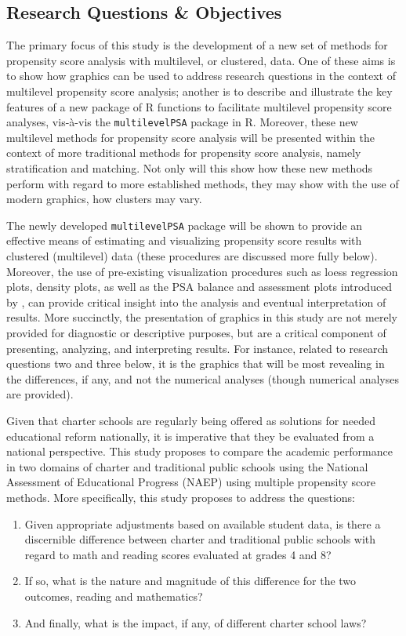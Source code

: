 \documentclass[letterpaper,12p,twoside]{article} %
\begin{document}
\subsection{Research Questions \& Objectives} 
The primary focus of this study is the development of a new set of methods for propensity score analysis with multilevel, or clustered, data. One of these aims is to show how graphics can be used to address research questions in the context of multilevel propensity score analysis; another is to describe and illustrate the key features of a new package of R functions to facilitate multilevel propensity score analyses, vis-\`{a}-vis the \texttt{multilevelPSA} package in R. Moreover, these new multilevel methods for propensity score analysis will be presented within the context of more traditional methods for propensity score analysis, namely stratification and matching. Not only will this show how these new methods perform with regard to more established methods, they may show with the use of modern graphics, how clusters may vary. 

The newly developed \texttt{multilevelPSA} package will be shown to provide an effective means of estimating and visualizing propensity score results with clustered (multilevel) data (these procedures are discussed more fully below). Moreover, the use of pre-existing visualization procedures such as loess regression plots, density plots, as well as the PSA balance and assessment plots introduced by , can provide critical insight into the analysis and eventual interpretation of results. More succinctly, the presentation of graphics in this study are not merely provided for diagnostic or descriptive purposes, but are a critical component of presenting, analyzing, and interpreting results. For instance, related to research questions two and three below, it is the graphics that will be most revealing in the differences, if any, and not the numerical analyses (though numerical analyses are provided).

Given that charter schools are regularly being offered as solutions for needed educational reform nationally, it is imperative that they be evaluated from a national perspective. This study proposes to compare the academic performance in two domains of charter and traditional public schools using the National Assessment of Educational Progress (NAEP) using multiple propensity score methods. More specifically, this study proposes to address the questions:

\begin{enumerate} 
	\item Given appropriate adjustments based on available student data, is there a discernible difference between charter and traditional public schools with regard to math and reading scores evaluated at grades 4 and 8?
	\item If so, what is the nature and magnitude of this difference for the two outcomes, reading and mathematics?
	\item And finally, what is the impact, if any, of different charter school laws?
\end{enumerate}
\end{document}
